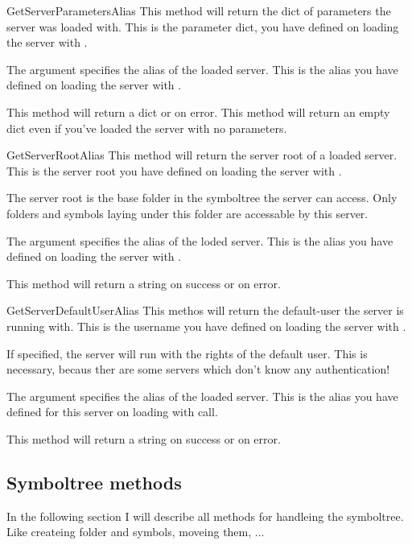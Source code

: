 \begin{methoddesc}[System]{GetServerParameters}{Alias}
This method will return the dict of parameters the server was loaded with. 
This is the parameter dict, you have defined on loading the server with 
.

The argument  specifies the alias of the loaded server. This is
the alias you have defined on loading the server with .

This method will return a dict or  on error. This method will
return an empty dict even if you've loaded the server with no parameters.
\end{methoddesc}


\begin{methoddesc}[System]{GetServerRoot}{Alias}
This method will return the server root of a loaded server. This is the 
server root you have defined on loading the server with .

The server root is the base folder in the symboltree the server can access. 
Only folders and symbols laying under this folder are accessable by this 
server.

The argument  specifies the alias of the loded server. This is the
alias you have defined on loading the server with . 

This method will return a string on success or  on error.
\end{methoddesc}


\begin{methoddesc}[System]{GetServerDefaultUser}{Alias}
This methos will return the default-user the server is running with. This is
the username you have defined on loading the server with .

If specified, the server will run with the rights of the default user. This is
necessary, becaus ther are some servers which don't know any authentication!

The argument  specifies the alias of the loaded server. This is the 
alias you have defined for this server on loading with  
call.

This method will return a string on success or  on error.
\end{methoddesc}


\subsection{Symboltree methods}
In the following section I will describe all methods for handleing the symboltree. 
Like createing folder and symbols, moveing them, ...

